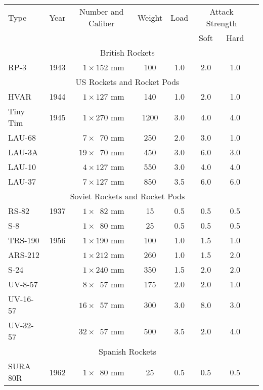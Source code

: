 \begin{twocolumntablefloat}
\begin{twocolumntable}
\begin{tabular}{lrcccccl}
\toprule
Type&
Year&
Number and Caliber&
Weight&
Load&
\multicolumn{2}{c}{Attack Strength}\\
\cmidrule{6-7}
&&&&&Soft&Hard\\
\midrule
\multicolumn{7}{c}{British Rockets}\\
\midrule
RP-3     &1943&$\phantom{0}1 \times \phantom{}152$ mm&\phantom{0}100&1.0&2.0&1.0\\
\midrule
\multicolumn{7}{c}{US Rockets and Rocket Pods}\\
\midrule
HVAR     &1944&$\phantom{0}1 \times \phantom{}127$ mm&\phantom{0}140&1.0&2.0&1.0\\
Tiny Tim &1945&$\phantom{0}1 \times \phantom{}270$ mm&\phantom{}1200&3.0&4.0&4.0\\
LAU-68   &    &$\phantom{0}7 \times \phantom{0}70$ mm&\phantom{0}250&2.0&3.0&1.0\\
LAU-3A   &    &$\phantom{}19 \times \phantom{0}70$ mm&\phantom{0}450&3.0&6.0&3.0\\
LAU-10   &    &$\phantom{0}4 \times \phantom{}127$ mm&\phantom{0}550&3.0&4.0&4.0\\
LAU-37   &    &$\phantom{0}7 \times \phantom{}127$ mm&\phantom{0}850&3.5&6.0&6.0\\
\midrule
\multicolumn{7}{c}{Soviet Rockets and Rocket Pods}\\
\midrule
RS-82    &1937&$\phantom{0}1 \times \phantom{0}82$ mm&\phantom{00}15&0.5&0.5&0.5\\
S-8      &    &$\phantom{0}1 \times \phantom{0}80$ mm&\phantom{00}25&0.5&0.5&0.5\\
TRS-190  &1956&$\phantom{0}1 \times \phantom{}190$ mm&\phantom{0}100&1.0&1.5&1.0\\
ARS-212  &    &$\phantom{0}1 \times \phantom{}212$ mm&\phantom{0}260&1.0&1.5&2.0\\
S-24     &    &$\phantom{0}1 \times \phantom{}240$ mm&\phantom{0}350&1.5&2.0&2.0\\
UV-8-57  &    &$\phantom{0}8 \times \phantom{0}57$ mm&\phantom{0}175&2.0&2.0&1.0\\
UV-16-57 &    &$\phantom{}16 \times \phantom{0}57$ mm&\phantom{0}300&3.0&8.0&3.0\\
UV-32-57 &    &$\phantom{}32 \times \phantom{0}57$ mm&\phantom{0}500&3.5&2.0&4.0\\
\midrule
\multicolumn{7}{c}{Spanish Rockets}\\
\midrule
SURA 80R &1962&$\phantom{0}1 \times \phantom{0}80$ mm&\phantom{00}25&0.5&0.5&0.5\\
\bottomrule
\end{tabular}
\end{twocolumntable}
\end{twocolumntablefloat}